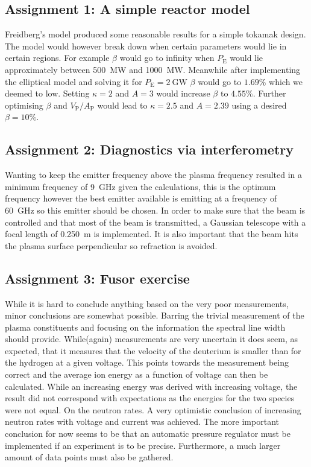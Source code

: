 \subsection{Assignment 1: A simple reactor model}
Freidberg's model produced some reasonable results for a simple tokamak design. The model would however break down when certain parameters would lie in certain regions. For example $\beta$ would go to infinity when $P_{\mathrm{E}}$ would lie approximately between \SI{500}{\mega\watt} and \SI{1000}{\mega\watt}. Meanwhile after implementing the elliptical model and solving it for $P_{\mathrm{E}}=\SI{2}{\giga\watt}$ $\beta$ would go to $1.69\%$ which we deemed to low. Setting $\kappa=2$ and $A=3$ would increase $\beta$ to $4.55\%$. Further optimising \(\beta\) and \(V_{\mathrm{P}}/A_{\mathrm{P}}\) would lead to \(\kappa=2.5\) and \(A=2.39\) using a desired \(\beta=10\%\).
\subsection{Assignment 2: Diagnostics via interferometry}
Wanting to keep the emitter frequency above the plasma frequency resulted in a minimum frequency of \SI{9}{\giga\hertz} given the calculations, this is the optimum frequency however the best emitter available is emitting at a frequency of \SI{60}{\giga\hertz} so this emitter should be chosen. In order to make sure that the beam is controlled and that most of the beam is transmitted, a Gaussian telescope with a focal length of \SI{0.250}{\meter} is implemented. It is also important that the beam hits the plasma surface perpendicular so refraction is avoided.
\subsection{Assignment 3: Fusor exercise}
While it is hard to conclude anything based on the very poor measurements, minor conclusions are somewhat possible. Barring the trivial measurement of the plasma constituents and focusing on the information the spectral line width should provide. While(again) measurements are very uncertain it does seem, as expected, that it measures that the velocity of the deuterium is smaller than for the hydrogen at a given voltage. This points towards the measurement being correct and the average ion energy as a function of voltage can then be calculated. While an increasing energy was derived with increasing voltage, the result did not correspond with expectations as the energies for the two species were not equal. On the neutron rates. A very optimistic conclusion of increasing neutron rates with voltage and current was achieved. The more important conclusion for now seems to be that an automatic pressure regulator must be implemented if an experiment is to be precise. Furthermore, a much larger amount of data points must also be gathered.
